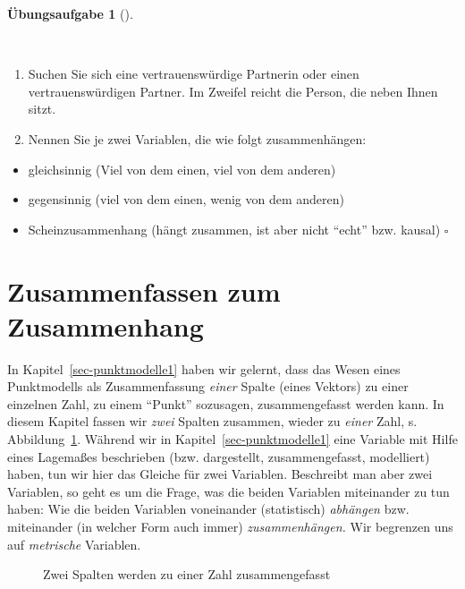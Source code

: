 \documentclass[
  letterpaper,
  twoside,
  open=any]{scrbook}
\providecommand{\tightlist}{%
  \setlength{\itemsep}{0pt}\setlength{\parskip}{0pt}}\usepackage{longtable,booktabs,array}
\theoremstyle{definition}
\newtheorem{exercise}{Übungsaufgabe}[chapter]
\theoremstyle{definition}
\theoremstyle{definition}
\theoremstyle{remark}
\begin{document}
\begin{exercise}[]\protect\hypertarget{exr-zsgh-studis}{}\label{exr-zsgh-studis}

~

\begin{enumerate}
\def\labelenumi{\arabic{enumi}.}
\tightlist
\item
  Suchen Sie sich eine vertrauenswürdige Partnerin oder einen
  vertrauenswürdigen Partner. Im Zweifel reicht die Person, die neben
  Ihnen sitzt.
\item
  Nennen Sie je zwei Variablen, die wie folgt zusammenhängen:
\end{enumerate}

\begin{itemize}
\tightlist
\item
  gleichsinnig (Viel von dem einen, viel von dem anderen)
\item
  gegensinnig (viel von dem einen, wenig von dem anderen)
\item
  Scheinzusammenhang (hängt zusammen, ist aber nicht \enquote{echt} bzw.
  kausal) \(\square\)
\end{itemize}

\end{exercise}

\section{Zusammenfassen zum
Zusammenhang}\label{zusammenfassen-zum-zusammenhang}

In Kapitel~\ref{sec-punktmodelle1} haben wir gelernt, dass das Wesen
eines Punktmodells als Zusammenfassung \emph{einer} Spalte (eines
Vektors) zu einer einzelnen Zahl, zu einem \enquote{Punkt} sozusagen,
zusammengefasst werden kann. In diesem Kapitel fassen wir \emph{zwei}
Spalten zusammen, wieder zu \emph{einer} Zahl, s.
Abbildung~\ref{fig-desk2}. Während wir in
Kapitel~\ref{sec-punktmodelle1} eine Variable mit Hilfe eines Lagemaßes
beschrieben (bzw. dargestellt, zusammengefasst, modelliert) haben, tun
wir hier das Gleiche für zwei Variablen. Beschreibt man aber zwei
Variablen, so geht es um die Frage, was die beiden Variablen miteinander
zu tun haben: Wie die beiden Variablen voneinander (statistisch)
\emph{abhängen} bzw. miteinander (in welcher Form auch immer)
\emph{zusammenhängen.} Wir begrenzen uns auf \emph{metrische} Variablen.

\begin{figure}


\caption{\label{fig-desk2}Zwei Spalten werden zu einer Zahl
zusammengefasst}

\end{figure}%
\end{document}
